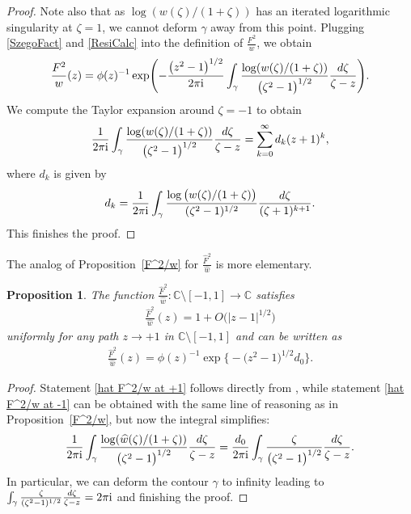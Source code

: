 \documentclass[11pt]{article}
\numberwithin{equation}{section}
\newcommand{\C}{\mathbb{C}}
\newcommand{\hw}{\widehat w}
\newcommand{\hF}{\widehat F}
\newcommand{\Fw}{\frac{F^2}{w}}
\newcommand{\hFw}{\frac{\hF^2}{\hw}}
\newcommand{\I}{\mathrm{i}}
\newtheorem{Proposition}[Theorem]{Proposition}
 { \theoremstyle{definition}
\newtheorem{Definition}[Theorem]{Definition}
\newtheorem{Note}[Theorem]{Note}
\newtheorem{Example}[Theorem]{Example}
\newtheorem{Remark}[Theorem]{Remark} }
\numberwithin{equation}{section}
\begin{document}
\begin{proof}
Note also that as $\log(w(\zeta)/(1+\zeta))$ has an iterated logarithmic singularity at $\zeta = 1$, we cannot deform $\gamma$ away from this point. Plugging \eqref{SzegoFact} and \eqref{ResiCalc} into the definition of $\Fw$, we obtain
\begin{align*}
 \Fw(z) = \phi(z)^{-1} \exp \Biggl( - \frac{\big(z^2-1\big)^{1/2}}{2\pi\I} \int_\gamma\frac{\log(w(\zeta)/(1+\zeta))}{\big(\zeta^2-1\big)^{1/2}} \frac{{\rm d}\zeta}{\zeta-z} \Biggr).
\end{align*}
We compute the Taylor expansion around $\zeta = -1$ to obtain
\begin{align*}
 \frac{1}{2\pi\I} \int_\gamma\frac{\log(w(\zeta)/(1+\zeta))}{\big(\zeta^2-1\big)^{1/2}} \frac{{\rm d}\zeta}{\zeta-z} = \sum_{k=0}^\infty d_k (z+1)^k,
\end{align*}
where $d_k$ is given by
\begin{align*}
 d_k = \frac{1}{2\pi\I} \int_\gamma \frac{\log\big(w(\zeta)/(1+\zeta)\big)}{(\zeta^2-1)^{1/2}}\frac{{\rm d}\zeta}{(\zeta+1)^{k+1}}.
\end{align*}
This finishes the proof.
\end{proof}

The analog of Proposition~\ref{F^2/w} for $\hFw$ is more elementary.

\begin{Proposition}
The function $\frac{\hF^2}{\hw} \colon \C \setminus [-1,1] \to \C$ satisfies
\begin{align}\label{hat F^2/w at +1}
 \frac{\hF^2}{\hw}(z) = 1 + O\big(|z-1|^{1/2}\big)
\end{align}
uniformly for any path $z \to +1$ in $\C \setminus [-1,1]$ and can be written as
\begin{align}\label{hat F^2/w at -1}
 \frac{\hF^2}{\hw}(z) = \phi(z)^{-1}\exp\bigl\lbrace-\big(z^2-1\big)^{1/2}d_0\bigr\rbrace.
\end{align}
\end{Proposition}
\begin{proof}
Statement \eqref{hat F^2/w at +1} follows directly from \cite[Lemma~6.4]{KMVV}, while statement \eqref{hat F^2/w at -1} can be obtained with the same line of reasoning as in Proposition~\ref{F^2/w}, but now the integral simplifies:
\begin{align*}
 \frac{1}{2\pi\I} \int_\gamma\frac{\log(\hw(\zeta)/(1+\zeta))}{\big(\zeta^2-1\big)^{1/2}} \frac{{\rm d}\zeta}{\zeta-z} = \frac{d_0}{2\pi\I} \int_\gamma\frac{\zeta}{\big(\zeta^2-1\big)^{1/2}} \frac{{\rm d}\zeta}{\zeta-z}.
\end{align*}
In particular, we can deform the contour $\gamma$ to infinity leading to $\int_\gamma\frac{\zeta}{(\zeta^2-1)^{1/2}} \frac{{\rm d}\zeta}{\zeta-z} = 2\pi\I$ and finishing the proof.
\end{proof}
\end{document}
